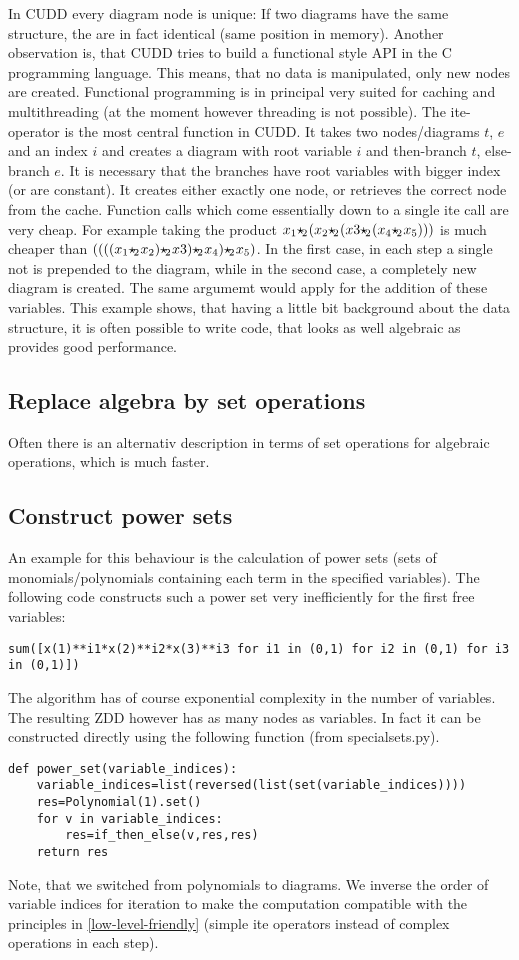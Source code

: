 \documentclass[]{article}
\newcommand{\CUDD}{{CUDD}\xspace}
\newcommand{\ite}{{ite}\xspace}
\providecommand{\boolemult}{\ensuremath{{\star\hspace{-.15em}_2\hspace{.05em}}}\xspace}
\begin{document}
In \CUDD every diagram node is unique: If two diagrams have the same structure, the are in fact identical (same position in memory).
Another observation is, that \CUDD tries to build a functional style API in the C programming language. This means, that no data is manipulated, only new nodes are created.
Functional programming is in principal very suited for caching and multithreading (at the moment however threading is not possible).
The \ite-operator is the most central function in CUDD. It takes two nodes/diagrams $t$, $e$ and an index $i$ and creates a diagram with root variable $i$ and
then-branch $t$, else-branch $e$. It is necessary that the branches have root variables with bigger index (or are constant).
It creates either exactly one node, or retrieves the correct node from the cache.
Function calls which come essentially down to a single \ite call are very cheap.
For example taking the product $x_1 \boolemult (x_2\boolemult(x3\boolemult (x_4\boolemult x_5)))$ is much cheaper than $((((x_1 \boolemult x_2)\boolemult x3)\boolemult x_4)\boolemult x_5)$.
In the first case, in each step a single not is prepended to the diagram, while in the second case, a completely new diagram is created.
The same argumemt would apply for the addition of these variables.
This example shows, that having a little bit background about the data structure, it is often possible to write code, that looks as well algebraic as provides good performance.

\subsection{Replace algebra by set operations}
Often there is an alternativ description in terms of set operations for algebraic operations, which is much faster.

\subsection{Construct power sets}
An example for this behaviour is the calculation of power sets (sets of monomials/polynomials containing each term in the specified variables).
The following code constructs such a power set very inefficiently for the first free variables:
\begin{verbatim}
sum([x(1)**i1*x(2)**i2*x(3)**i3 for i1 in (0,1) for i2 in (0,1) for i3 in (0,1)])
\end{verbatim}
The algorithm has of course exponential complexity in the number of variables.
The resulting ZDD however has as many nodes as variables.
In fact it can be constructed directly using the following function (from specialsets.py).
\begin{verbatim}
def power_set(variable_indices):
    variable_indices=list(reversed(list(set(variable_indices))))
    res=Polynomial(1).set()
    for v in variable_indices:
        res=if_then_else(v,res,res)
    return res
\end{verbatim}
Note, that we switched from polynomials to diagrams. We inverse the order of variable indices for iteration to make the computation compatible with the principles in \ref{low-level-friendly} (simple \ite operators instead of complex operations in each step).
\end{document}
